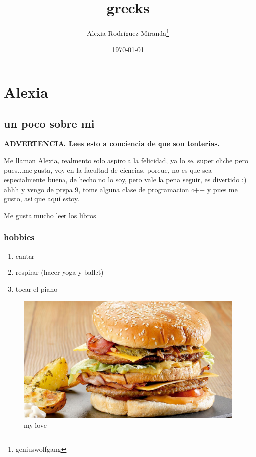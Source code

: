 \documentclass{book}
\title{grecks}
\date{\today}
\author{Alexia Rodríguez Miranda\thanks{geniuswolfgang}}
\begin{document}
\maketitle

\chapter{Alexia}

\section{un poco sobre mi}
\textbf{ADVERTENCIA. Lees esto a conciencia de que son tonterias.}

Me llaman Alexia, realmento solo aspiro a la felicidad, ya lo se, super cliche pero pues...me gusta, voy en la facultad de ciencias, porque, no es que sea especialmente buena, de hecho no lo soy, pero vale la pena seguir, es divertido :) ahhh y vengo de prepa 9, tome alguna clase de programacion c++ y pues me gusto, así que aquí estoy. 


Me gusta mucho leer los libros~\cite{torres,comunidad,retorno}

\subsection{hobbies}

\begin{enumerate}
\item cantar
\item respirar (hacer yoga y ballet)
\item tocar el piano
\end{enumerate}

\begin{figure}[h]
  \centering
  \includegraphics[scale=0.10]{IMG/6.jpg}
  \caption{my love}
  \label{fig:hamburguesa}
\end {figure}
\end{document}
